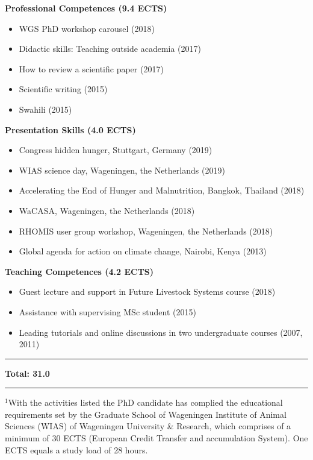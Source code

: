 \textbf{Professional Competences (9.4 ECTS)}
\vspace{-2mm}
\begin{itemize}[nolistsep,topsep=0cm]
    \item WGS PhD workshop carousel (2018)
    \item Didactic skills: Teaching outside academia (2017)
    \item How to review a scientific paper (2017)
    \item Scientific writing (2015)
    \item Swahili (2015)
\end{itemize}

\textbf{Presentation Skills (4.0 ECTS)}
\vspace{-2mm}
\begin{itemize}[nolistsep,topsep=0cm]
    \item Congress hidden hunger, Stuttgart, Germany (2019)
    \item WIAS science day, Wageningen, the Netherlands (2019)
    \item Accelerating the End of Hunger and Malnutrition, Bangkok, Thailand (2018)
    \item WaCASA, Wageningen, the Netherlands (2018)
    \item RHOMIS user group workshop, Wageningen, the Netherlands (2018)
    \item Global agenda for action on climate change, Nairobi, Kenya (2013)
\end{itemize}

\textbf{Teaching Competences (4.2 ECTS)}
\vspace{-2mm}
\begin{itemize}[nolistsep,topsep=0cm]
    \item Guest lecture and support in Future Livestock Systems course (2018)
	\item Assistance with supervising MSc student (2015)
    \item Leading tutorials and online discussions in two undergraduate courses (2007, 2011)
\end{itemize}

\vspace{5mm}

\hrule
\textbf{Total: 31.0}
\vspace{2mm}
\hrule
\small
$^1$With the activities listed the PhD candidate has complied the educational requirements set by the Graduate School of Wageningen Institute of Animal Sciences (WIAS) of Wageningen University \& Research, which comprises of a minimum of 30 ECTS (European Credit Transfer and accumulation System). One ECTS equals a study load of 28 hours.
\normalsize
